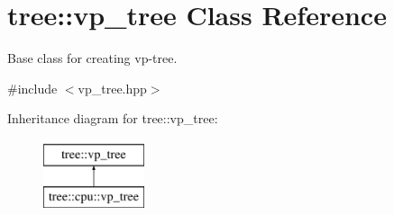 \hypertarget{classtree_1_1vp__tree}{}\section{tree\+:\+:vp\+\_\+tree Class Reference}
\label{classtree_1_1vp__tree}


Base class for creating vp-\/tree.  




{\ttfamily \#include $<$vp\+\_\+tree.\+hpp$>$}

Inheritance diagram for tree\+:\+:vp\+\_\+tree\+:\begin{figure}[H]
\begin{center}
\leavevmode
\includegraphics[height=2.000000cm]{classtree_1_1vp__tree}
\end{center}
\end{figure}
